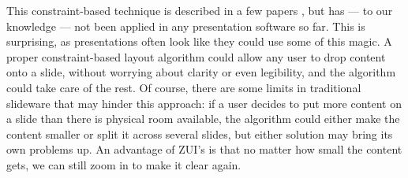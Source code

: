   This constraint-based technique is described in a few papers
   \citep{lok-1,hurst-1}, but has --- to our knowledge --- not been applied in
   any presentation software so far. This is surprising, as presentations often
   look like they could use some of this magic. A proper constraint-based
   layout algorithm could allow any user to drop content onto a slide, without
   worrying about clarity or even legibility, and the algorithm could take care
   of the rest. Of course, there are some limits in traditional slideware that
   may hinder this approach: if a user decides to put more content on a slide
   than there is physical room available, the algorithm could either make the
   content smaller or split it across several slides, but either solution may
   bring its own problems up. An advantage of ZUI's is that no matter how small
   the content gets, we can still zoom in to make it clear again.


